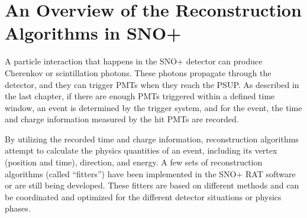
\section{An Overview of the Reconstruction Algorithms in SNO+}
A particle interaction that happens in the SNO+ detector can produce Cherenkov or scintillation photons. These photons propagate through the detector, and they can trigger PMTs when they reach the PSUP. As described in the last chapter, if there are enough PMTs triggered within a defined time window, an event is determined by the trigger system, and for the event, the time and charge information measured by the hit PMTs are recorded.

By utilizing the recorded time and charge information, reconstruction algorithms attempt to calculate the physics quantities of an event, including its vertex (position and time), direction, and energy. A few sets of reconstruction algorithms (called ``fitters'') have been implemented in the SNO+ RAT software or are still being developed. These fitters are based on different methods and can be coordinated and optimized for the different detector situations or physics phases.

